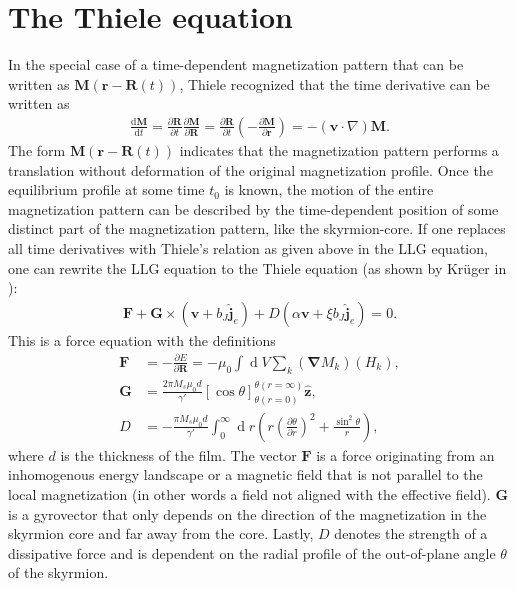 \documentclass[12pt, a4paper, twoside, openright]{report}
\renewcommand{\d}[1]{\ensuremath{\operatorname{d}\!{#1}}}
\numberwithin{equation}{chapter}
\numberwithin{figure}{chapter}
\numberwithin{table}{chapter}
\begin{document}
\section{The Thiele equation}
In the special case of a time-dependent magnetization pattern that can be written as $\mathbold{M}(\mathbold{r}-\mathbold{R}(t))$, Thiele recognized \cite{Thiele1973} that the time derivative can be written as 
\begin{align}
\label{eq:ThieleRelation}
\frac{\textrm{d} \mathbold{M}}{\textrm{d} t} = \frac{\partial \mathbold{R}}{\partial t}\frac{\partial \mathbold{M}}{\partial \mathbold{R}} = \frac{\partial \mathbold{R}}{\partial t} (-\frac{\partial \mathbold{M}}{\partial \mathbold{r}}) = -(\mathbold{v}\cdot\nabla)\mathbold{M}.
\end{align}
The form $\mathbold{M}(\mathbold{r}-\mathbold{R}(t))$ indicates that the magnetization pattern performs a translation without deformation of the original magnetization profile. Once the equilibrium profile at some time $t_0$ is known, the motion of the entire magnetization pattern can be described by the time-dependent position of some distinct part of the magnetization pattern, like the skyrmion-core. If one replaces all time derivatives with Thiele's relation as given above in the LLG equation, one can rewrite the LLG equation to the Thiele equation (as shown by Kr\"{u}ger in \cite{krugerDissertation}):
\begin{align}
\label{eq:Thiele}
\mathbold{F} + \mathbold{G}\times(\mathbold{v}+b_J\mathbold{\hat{j}}_e) + D(\alpha\mathbold{v}+\xi b_J\mathbold{\hat{j}}_e) = 0.
\end{align}
This is a force equation with the definitions
\begin{subequations}
\label{eq:ThieleFGD}
\begin{align}
\label{eq:ThieleF}
\mathbold{F} &= -\frac{\partial E}{\partial \mathbold{R}} = -\mu_0\int \d V\sum_k (\mathbold{\nabla}M_k)(H_k), \\
\label{eq:ThieleG}
\mathbold{G} &= \frac{2\pi M_s\mu_0 d}{\gamma'}\left[\cos\theta\right]_{\theta(r=0)}^{\theta(r=\infty)} \mathbold{\hat{z}},\\
\label{eq:ThieleD}
D &= - \frac{\pi M_s \mu_0 d}{\gamma '} \int_0^{\infty} \d r \left(r\left(\frac{\partial \theta}{\partial r}\right)^2+\frac{\sin^2\theta}{r}\right),
\end{align}
\end{subequations}
where $d$ is the thickness of the film. The vector $\mathbold{F}$ is a force originating from an inhomogenous energy landscape or a magnetic field that is not parallel to the local magnetization (in other words a field not aligned with the effective field). $\mathbold{G}$ is a gyrovector that only depends on the direction of the magnetization in the skyrmion core and far away from the core. Lastly, $D$ denotes the strength of a dissipative force and is dependent on the radial profile of the out-of-plane angle $\theta$ of the skyrmion.  
\end{document}
